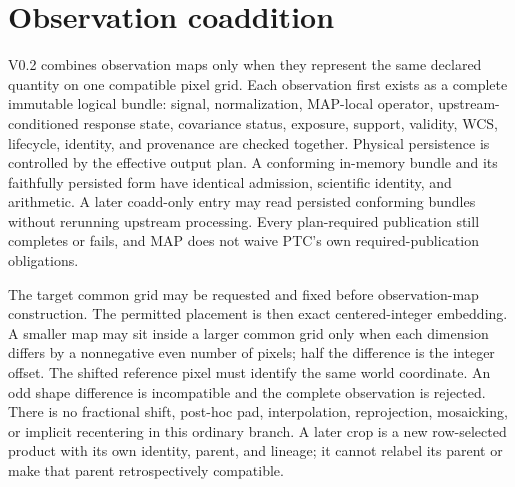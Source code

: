 \documentclass[10pt]{article}
\begin{document}
\section{Observation coaddition}\label{sec:coadd}
V0.2 combines observation maps only when they represent the same declared
quantity on one compatible pixel grid. Each observation first exists as a
complete immutable logical bundle: signal, normalization, MAP-local operator,
upstream-conditioned response state, covariance status, exposure, support,
validity, WCS, lifecycle, identity, and provenance are checked together.
Physical persistence is controlled by the effective output plan. A conforming
in-memory bundle and its faithfully persisted form have identical admission,
scientific identity, and arithmetic. A later coadd-only entry may read
persisted conforming bundles without rerunning upstream processing. Every
plan-required publication still completes or fails, and MAP does not waive
PTC's own required-publication obligations.

\SCIMapProductRoleDefinition

\SCIMapProductRoleDependencyTable

The target common grid may be requested and fixed before observation-map
construction. The permitted placement is then exact centered-integer
embedding. A smaller map may
sit inside a larger common grid only when each dimension differs by a
nonnegative even number of pixels; half the difference is the integer offset.
The shifted reference pixel must identify the same world coordinate. An odd
shape difference is incompatible and the complete observation is rejected.
There is no fractional shift, post-hoc pad, interpolation, reprojection,
mosaicking, or implicit recentering in this ordinary branch. A later crop is
a new row-selected product with its own identity, parent, and lineage; it
cannot relabel its parent or make that parent retrospectively compatible.
\end{document}
